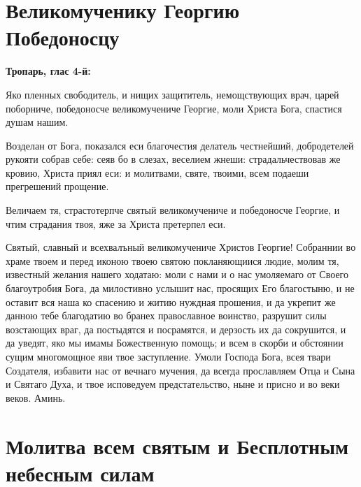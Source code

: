 
 

\section{Великомученику Георгию Победоносцу}
 
\bfseries Тропарь, глас 4-й:\normalfont{}


Яко пленных свободитель, и нищих защититель, немощствующих врач, царей поборниче, победоносче великомучениче Георгие, моли Христа Бога, спастися душам нашим.




Возделан от Бога, показался еси благочестия делатель честнейший, добродетелей рукояти собрав себе: сеяв бо в слезах, веселием жнеши: страдальчествовав же кровию, Христа приял еси: и молитвами, святе, твоими, всем подаеши прегрешений прощение.




Величаем тя, страстотерпче святый великомучениче и победоносче Георгие, и чтим страдания твоя, яже за Христа претерпел еси.




Святый, славный и всехвалъный великомучениче Христов Георгие! Собраннии во храме твоем и перед иконою твоею святою покланяющиися людие, молим тя, известный желания нашего ходатаю: моли с нами и о нас умоляемаго от Своего благоутробия Бога, да милостивно услышит нас, просящих Его благостыню, и не оставит вся наша ко спасению и житию нуждная прошения, и да укрепит же данною тебе благодатию во бранех православное воинство, разрушит силы возстающих враг, да постыдятся и посрамятся, и дерзость их да сокрушится, и да уведят, яко мы имамы Божественную помощь; и всем в скорби и обстоянии сущим многомощное яви твое заступление. Умоли Господа Бога, всея твари Создателя, избавити нас от вечнаго мучения, да всегда прославляем Отца и Сына и Святаго Духа, и твое исповедуем предстательство, ныне и присно и во веки веков. Аминь.
\mychapterending


 

\section{Молитва всем святым и Бесплотным небесным силам}
 


